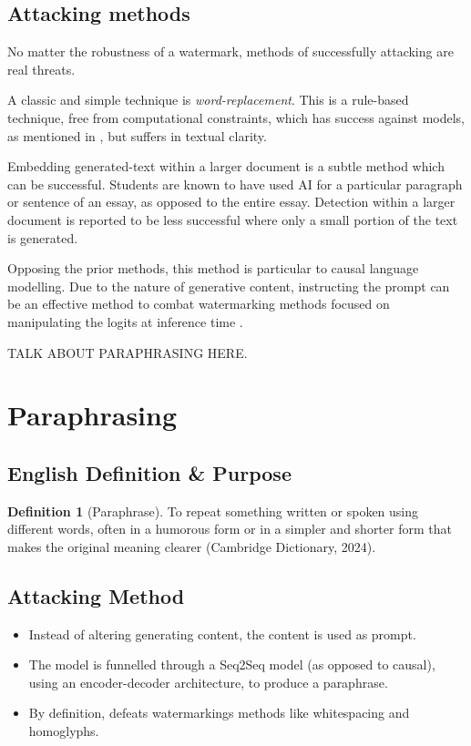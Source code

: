 \documentclass{l4proj}
\theoremstyle{definition}
\newtheorem{definition}{Definition}[section]
\begin{document}
    \subsection{Attacking methods}
        No matter the robustness of a watermark, methods of successfully attacking are real threats. 

        A classic and simple technique is \textit{word-replacement}. This is a rule-based technique, free from computational constraints, which has success against models, as mentioned in \cite{reference here}, but suffers in textual clarity.

        Embedding generated-text within a larger document is a subtle method which can be successful. Students are known to have used AI for a particular paragraph or sentence of an essay, as opposed to the entire essay. Detection within a larger document is reported to be less successful \cite{okay okay, pray for the source} where only a small portion of the text is generated. 

        Opposing the prior methods, this method is particular to causal language modelling. Due to the nature of generative content, instructing the prompt can be an effective method to combat watermarking methods focused on manipulating the logits at inference time \cite{maryland, sorry bro}. 

        TALK ABOUT PARAPHRASING HERE.
        

\section{Paraphrasing}
    \subsection{English Definition \& Purpose}
        \begin{definition}[Paraphrase]
            To repeat something written or spoken using different words, often in a humorous form or in a simpler and shorter form that makes the original meaning clearer (Cambridge Dictionary, 2024).
        \end{definition}
    \subsection{Attacking Method}
        \begin{itemize}
            \setlength\itemsep{0.5em}
            \item Instead of altering generating content, the content is used as prompt.
            \item The model is funnelled through a Seq2Seq model (as opposed to causal), using an encoder-decoder architecture, to produce a paraphrase.
            \item By definition, defeats watermarkings methods like whitespacing and homoglyphs. 
        \end{itemize}
\end{document}
